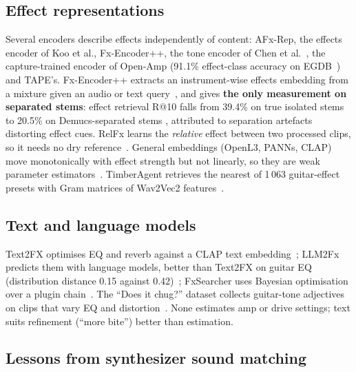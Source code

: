 \subsection{Effect representations}

Several encoders describe effects independently of content: AFx-Rep, the effects
encoder of Koo et al., Fx-Encoder++, the tone encoder of Chen et
al.~\cite{chen2024zeroshot}, the capture-trained encoder of Open-Amp (91.1\%
effect-class accuracy on EGDB~\cite{wright2025openamp}) and TAPE's.
Fx-Encoder++ extracts an instrument-wise effects embedding from a mixture given
an audio or text query~\cite{yeh2025fxencoder}, and gives \textbf{the only
measurement on separated stems}: effect retrieval R@10 falls from 39.4\% on true
isolated stems to 20.5\% on Demucs-separated stems \reported, attributed to
separation artefacts distorting effect cues. RelFx learns the \emph{relative}
effect between two processed clips, so it needs no dry
reference~\cite{liu2026beyond}. General embeddings (OpenL3, PANNs, CLAP) move
monotonically with effect strength but not linearly, so they are weak parameter
estimators~\cite{deng2025investigating}. TimberAgent retrieves the nearest of
1\,063 guitar-effect presets with Gram matrices of Wav2Vec2
features~\cite{he2026timberagent}.

\subsection{Text and language models}

Text2FX optimises EQ and reverb against a CLAP text embedding~\cite{chu2025text2fx};
LLM2Fx predicts them with language models, better than Text2FX on guitar EQ
(distribution distance 0.15 against 0.42)~\cite{doh2025llm2fx}; FxSearcher uses
Bayesian optimisation over a plugin chain~\cite{ki2025fxsearcher}. The ``Does it
chug?'' dataset collects guitar-tone adjectives on clips that vary EQ and
distortion~\cite{sutar2024chug}. None estimates amp or drive settings; text suits
refinement (``more bite'') better than estimation.

\subsection{Lessons from synthesizer sound matching}

